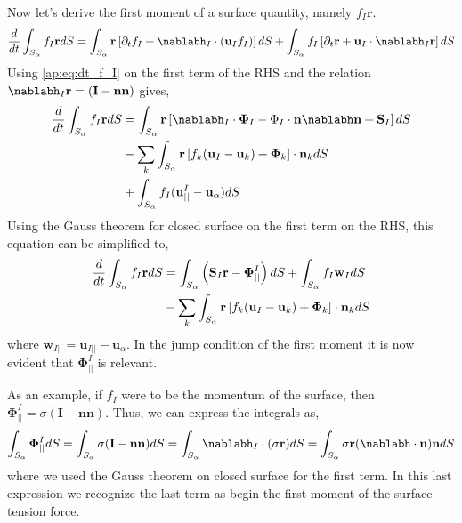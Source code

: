 Now let's derive the first moment of a surface quantity, namely $f_I \textbf{r}$. 
\begin{align*}
    \ddt \int_{S_\alpha} f_I \textbf{r} dS
    &= \int_{S_\alpha} \textbf{r}\left[
        \pddt f_I 
        + \nablabh_I \cdot (\textbf{u}_If_I) 
    \right]dS
    + \int_{S_\alpha}
    f_I \left[
        \pddt \textbf{r} + \textbf{u}_I \cdot \nablabh_I \textbf{r}
    \right]
    dS\\
\end{align*}
Using \ref{ap:eq:dt_f_I} on the first term of the RHS and the relation $\nablabh_I \textbf{r} = (\textbf{I} - \textbf{nn})$ gives, 
\begin{align*}
    \ddt \int_{S_\alpha} f_I \textbf{r} dS
    &= \int_{S_\alpha} \textbf{r}\left[
        \nablabh_I \cdot \mathbf{\Phi}_I
        - \Phi_I\cdot\textbf{n}\nablabh\textbf{n}
        + \textbf{S}_I
    \right] dS\\
    & - \sum_k \int_{S_\alpha}\textbf{r} \left[
        f_k (\textbf{u}_I - \textbf{u}_k)
        + \mathbf{\Phi}_k
    \right] \cdot \textbf{n}_k
    dS\\
    &+ \int_{S_\alpha}
    f_I (\textbf{u}^I_{||} - \textbf{u}_\alpha)
    dS\\
\end{align*}
Using the Gauss theorem for closed surface on the first term on the RHS, this equation can be simplified to, 
\begin{align}
    \frac{d}{d t} \int_{S_\alpha} f_I \textbf{r} dS
    &= \int_{S_\alpha} \left(
        \textbf{S}_I\textbf{r}
        - \mathbf{\Phi}_{||}^I
    \right) dS
    + \int_{S_\alpha}
    f_I \textbf{w}_I
    dS\nonumber\\
    & - \sum_k \int_{S_\alpha}\textbf{r} \left[
        f_k (\textbf{u}_I - \textbf{u}_k)
        + \mathbf{\Phi}_k
    \right] \cdot \textbf{n}_k
    dS
    \label{ap:eq:dt_r_f_I}
\end{align}
where $\textbf{w}_{I||} = \textbf{u}_{I||} - \textbf{u}_\alpha$. 
In the jump condition of the first moment it is now evident that $\mathbf{\Phi}^I_{||}$ is relevant. 

As an example, if $f_I$ were to be the momentum of the surface, then $\mathbf{\Phi}_{||}^I = \sigma (\textbf{I} - \textbf{nn})$. 
Thus, we can express the integrals as, 
\begin{equation*}
    \int_{S_\alpha}\mathbf{\Phi}_{||}^IdS
    =\int_{S_\alpha} \sigma (\textbf{I} - \textbf{nn}) dS
    =\int_{S_\alpha} \nablabh_I \cdot (\sigma \textbf{r}) dS
    =\int_{S_\alpha} \sigma \textbf{r} (\nablabh\cdot\textbf{n}) \textbf{n} dS
\end{equation*} 
where we used the Gauss theorem on closed surface for the first term. 
In this last expression we recognize the last term as begin the first moment of the surface tension force. 




